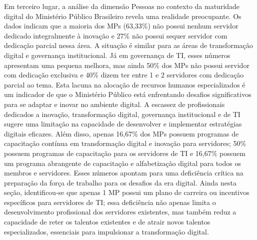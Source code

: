 Em terceiro lugar, a análise da dimensão Pessoas no contexto da maturidade digital do Ministério Público Brasileiro revela uma realidade preocupante. Os dados indicam que a maioria dos MPs (63,33\%) não possui nenhum servidor dedicado integralmente à inovação e 27\% não possui sequer servidor com dedicação parcial nessa área. A situação é similar para as áreas de transformação digital e governança institucional. Já em governança de TI, esses números apresentam uma pequena melhora, mas ainda 50\% dos MPs não possui servidor com dedicação exclusiva e 40\% dizem ter entre 1 e 2 servidores com dedicação parcial ao tema. Esta lacuna na alocação de recursos humanos especializados é um indicador de que o Ministério Público está enfrentando desafios significativos para se adaptar e inovar no ambiente digital. A escassez de profissionais dedicados a inovação, transformação digital, governança institucional e de TI sugere uma limitação na capacidade de desenvolver e implementar estratégias digitais eficazes. Além disso, apenas 16,67\% dos MPs possuem programas de capacitação contínua em transformação digital e inovação para servidores; 50\% possuem programas de capacitação para os servidores de TI e 16,67\% possuem um programa abrangente de capacitação e alfabetização digital para todos os membros e servidores. Esses números apontam para uma deficiência crítica na preparação da força de trabalho para os desafios da era digital. Ainda nesta seção, identificou-se que apenas 1 MP possui um plano de carreira ou incentivos específicos para servidores de TI; essa deficiência não apenas limita o desenvolvimento profissional dos servidores existentes, mas também reduz a capacidade de reter os talentos existentes e de atrair novos talentos especializados, essenciais para impulsionar a transformação digital.

